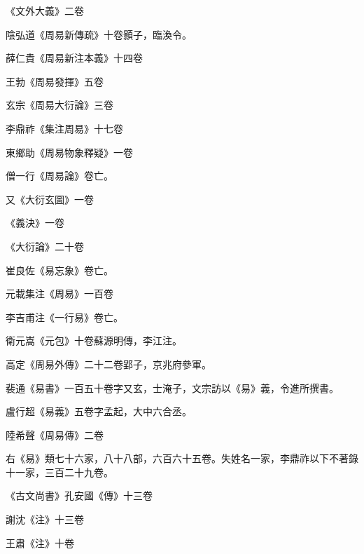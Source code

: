\begin{pinyinscope}
 《文外大義》二卷



 陰弘道《周易新傳疏》十卷顥子，臨渙令。



 薛仁貴《周易新注本義》十四卷



 王勃《周易發揮》五卷



 玄宗《周易大衍論》三卷



 李鼎祚《集注周易》十七卷



 東鄉助《周易物象釋疑》一卷



 僧一行《周易論》卷亡。



 又《大衍玄圖》一卷



 《義決》一卷



 《大衍論》二十卷



 崔良佐《易忘象》卷亡。



 元載集注《周易》一百卷



 李吉甫注《一行易》卷亡。



 衛元嵩《元包》十卷蘇源明傳，李江注。



 高定《周易外傳》二十二卷郢子，京兆府參軍。



 裴通《易書》一百五十卷字又玄，士淹子，文宗訪以《易》義，令進所撰書。



 盧行超《易義》五卷字孟起，大中六合丞。



 陸希聲《周易傳》二卷



 右《易》類七十六家，八十八部，六百六十五卷。失姓名一家，李鼎祚以下不著錄十一家，三百二十九卷。



 《古文尚書》孔安國《傳》十三卷



 謝沈《注》十三卷



 王肅《注》十卷




\end{pinyinscope}
